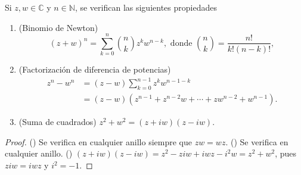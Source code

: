 

\begin{theorem}
Si $z, w \in \mathbb{C}$ y $n \in \mathbb{N}$, se verifican las siguientes propiedades
\begin{enumerate}[label=\textnormal{(\roman*)}]
\item (Binomio de Newton)
\begin{equation*}
    (z + w)^n = \sum_{k=0}^{n} \binom{n}{k} z^k w^{n-k}, \text{ donde } \binom{n}{k} = \frac{n!}{k! (n-k)!},
\end{equation*}
\item (Factorización de diferencia de potencias)
\begin{align*}
    z^n - w^n &= (z - w) \sum_{k=0}^{n-1} z^k w^{n-1-k} \\
              &= (z - w)(z^{n-1} + z^{n-2} w + \cdots + z w^{n-2} + w^{n-1}).
\end{align*}
\item (Suma de cuadrados) $z^2 + w^2 = (z + i w)(z - i w)$.
\end{enumerate}
\end{theorem}

\begin{proof}
({\scshape{}}) Se verifica en cualquier anillo siempre que $z w = w z$. ({\scshape{}}) Se verifica en cualquier anillo. ({\scshape{}}) $(z + i w)(z - i w) = z^2 - z i w + i w z - i^2 w = z^2 + w^2$, pues $z i w = i w z$ y $i^2 = - 1$.
\end{proof}
